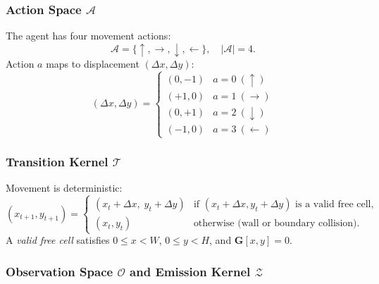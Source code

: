 \documentclass[11pt,a4paper]{article}
\newcommand{\cA}{\mathcal{A}}
\newcommand{\cO}{\mathcal{O}}
\newcommand{\cT}{\mathcal{T}}
\newcommand{\cZ}{\mathcal{Z}}
\begin{document}
\subsubsection{Action Space $\cA$}

The agent has four movement actions:
\begin{equation}
  \cA = \{{\uparrow}, {\rightarrow}, {\downarrow}, {\leftarrow}\},
  \quad |\cA| = 4.
\end{equation}
Action $a$ maps to displacement $(\Delta x, \Delta y)$:
\begin{equation}
  (\Delta x, \Delta y) =
  \begin{cases}
    (0, -1) & a = 0\ (\uparrow) \\
    (+1, 0) & a = 1\ (\rightarrow) \\
    (0, +1) & a = 2\ (\downarrow) \\
    (-1, 0) & a = 3\ (\leftarrow)
  \end{cases}
\end{equation}

\subsubsection{Transition Kernel $\cT$}

Movement is deterministic:
\begin{equation}
  (x_{t+1}, y_{t+1}) =
  \begin{cases}
    (x_t + \Delta x,\; y_t + \Delta y)
      & \text{if }(x_t{+}\Delta x, y_t{+}\Delta y)\text{ is a valid free cell,} \\
    (x_t, y_t)
      & \text{otherwise (wall or boundary collision).}
  \end{cases}
\end{equation}
A \emph{valid free cell} satisfies $0 \le x < W$, $0 \le y < H$,
and $\mathbf{G}[x,y] = 0$.

\subsubsection{Observation Space $\cO$ and Emission Kernel $\cZ$}
\end{document}
